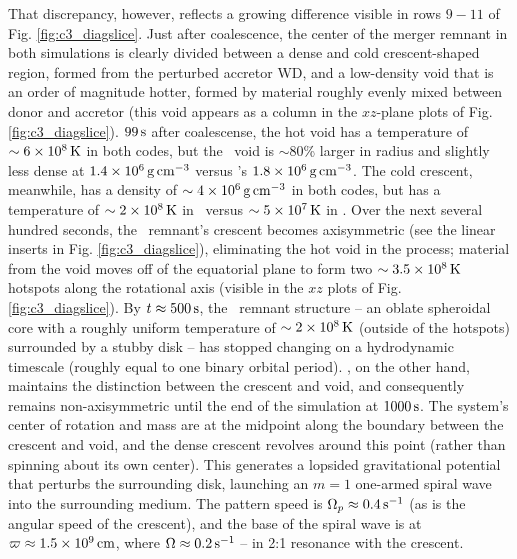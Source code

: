

That discrepancy, however, reflects a growing difference visible in rows $9 - 11$ of Fig. \ref{fig:c3_diagslice}.  Just after coalescence, the center of the merger remnant in both simulations is clearly divided between a dense and cold crescent-shaped region, formed from the perturbed accretor WD, and a low-density void that is an order of magnitude hotter, formed by material roughly evenly mixed between donor and accretor (this void appears as a column in the $xz$-plane plots of Fig. \ref{fig:c3_diagslice}).  $99\,\mathrm{s}$ after coalescense, the hot void has a temperature of $\sim6\times10^8\,\mathrm{K}$ in both codes, but the \arepo\ void is $\sim80$\% larger in radius and slightly less dense at $1.4\times10^6\,\gcc$ versus \gasoline's $1.8\times10^6\,\gcc$.  The cold crescent, meanwhile, has a density of $\sim4\times10^6\,\gcc$ in both codes, but has a temperature of $\sim2\times10^8\,\mathrm{K}$ in \gasoline\ versus $\sim5\times10^7\,\mathrm{K}$ in \arepo.  Over the next several hundred seconds, the \gasoline\ remnant's crescent becomes axisymmetric (see the linear inserts in Fig. \ref{fig:c3_diagslice}), eliminating the hot void in the process; material from the void moves off of the equatorial plane to form two $\sim3.5\times10^8\,\mathrm{K}$ hotspots along the rotational axis (visible in the $xz$ plots of Fig. \ref{fig:c3_diagslice}).  By $t\approx500\,\mathrm{s}$, the \gasoline\ remnant structure -- an oblate spheroidal core with a roughly uniform temperature of $\sim 2 \times 10^8\,\mathrm{K}$ (outside of the hotspots) surrounded by a stubby disk -- has stopped changing on a hydrodynamic timescale (roughly equal to one binary orbital period).  \arepo, on the other hand, maintains the distinction between the crescent and void, and consequently remains non-axisymmetric until the end of the simulation at $1000\,\mathrm{s}$.  The system's center of rotation and mass are at the midpoint along the boundary between the crescent and void, and the dense crescent revolves around this point (rather than spinning about its own center).  This generates a lopsided gravitational potential that perturbs the surrounding disk, launching an $m = 1$ one-armed spiral wave into the surrounding medium.  The pattern speed is $\Omega_p \approx 0.4\,\mathrm{s}^{-1}$ (as is the angular speed of the crescent), and the base of the spiral wave is at $\varpi \approx 1.5\times10^9\,\mathrm{cm}$, where $\Omega \approx 0.2\,\mathrm{s}^{-1}$ -- in 2:1 resonance with the crescent.

